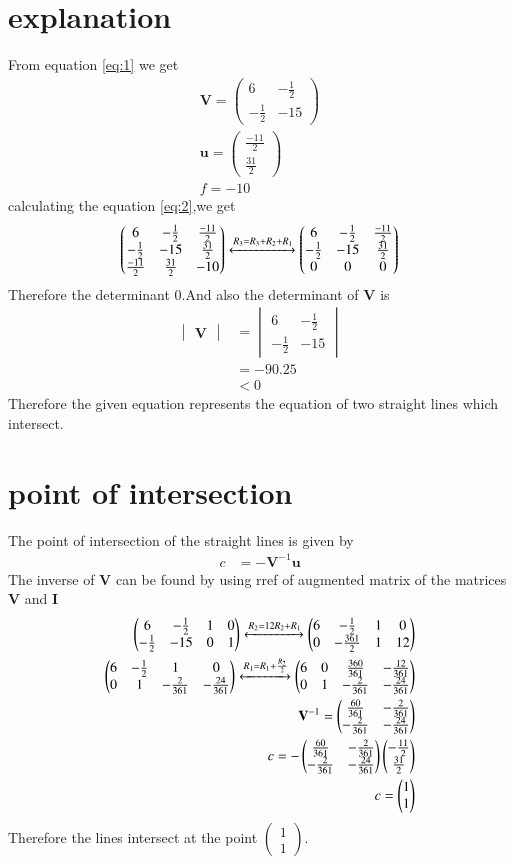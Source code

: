 \documentclass[journal,12pt,twocolumn]{IEEEtran}
\newcommand{\myvec}[1]{\ensuremath{\begin{pmatrix}#1\end{pmatrix}}}
\newcommand{\mydet}[1]{\ensuremath{\begin{vmatrix}#1\end{vmatrix}}}
\numberwithin{equation}{subsection}
\let\vec\mathbf
\begin{document}
\section{explanation}
From equation \eqref{eq:1} we get
\begin{align}
    \vec{V}=\myvec{6&-\frac{1}{2}\\-\frac{1}{2}&-15}\\
    \vec{u}=\myvec{\frac{-11}{2}\\ \frac{31}{2}}\\
    f=-10
\end{align}
calculating the equation \eqref{eq:2},we get
\begin{align}
    \myvec{6&-\frac{1}{2}&\frac{-11}{2}\\-\frac{1}{2}&-15&\frac{31}{2}\\\frac{-11}{2}&\frac{31}{2}&-10}\xleftrightarrow[]{R_3=R_3+R_2+R_1}\myvec{6&-\frac{1}{2}&\frac{-11}{2}\\-\frac{1}{2}&-15&\frac{31}{2}\\0&0&0}
\end{align}
Therefore the determinant $0$.And also the determinant of $\vec{V}$ is
\begin{align}
    \mydet{\vec{V}}&=\mydet{6&-\frac{1}{2}\\-\frac{1}{2}&-15}\\
    &=-90.25\\
    &<0
\end{align}
Therefore the given equation represents the equation of two straight lines which intersect.
\section{point of intersection}
The point of intersection of the straight lines is given by 
\begin{align}
    c&=-\vec{V}^{-1}\vec{u}
\end{align}
The inverse of $\vec{V}$ can be found by using rref of augmented matrix of the matrices $\vec{V}$ and $\vec{I}$
\begin{align}
    \myvec{6&-\frac{1}{2}&1&0\\-\frac{1}{2}&-15&0&1}\xleftrightarrow{R_2=12R_2+R_1}\myvec{6&-\frac{1}{2}&1&0\\0&-\frac{361}{2}&1&12}\\
    \myvec{6&-\frac{1}{2}&1&0\\0&1&-\frac{2}{361}&-\frac{24}{361}}\xleftrightarrow{R_1=R_1+\frac{R_2}{2}}\myvec{6&0&\frac{360}{361}&-\frac{12}{361}\\0&1&-\frac{2}{361}&-\frac{24}{361}}\\
    \vec{V}^{-1}=\myvec{\frac{60}{361}&-\frac{2}{361}\\-\frac{2}{361}&-\frac{24}{361}}\\
    c=-\myvec{\frac{60}{361}&-\frac{2}{361}\\-\frac{2}{361}&-\frac{24}{361}}\myvec{-\frac{11}{2}\\\frac{31}{2}}\\
    c=\myvec{1\\1}
\end{align}
Therefore the lines intersect at the point $\myvec{1\\1}$.
\end{document}
